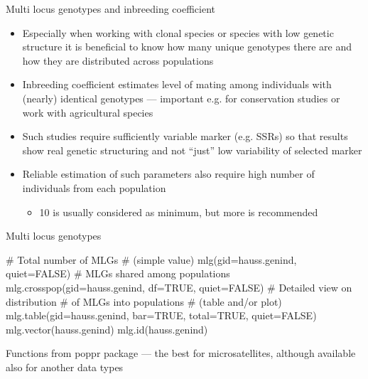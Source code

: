 \documentclass[compress, ucs, xelatex, 11pt, xcolor=svgnames, aspectratio=169,
	hyperref={
		bookmarks=true,
		unicode=true,
		colorlinks=true,
		pdftitle={Molecular data in R},
		plainpages=false,
		pdfauthor={Vojtech Zeisek},
		pdfsubject={Course about phylogeny and evolution in R},
		pdfcreator={XeLaTeX},
		pdfkeywords={R, evolution, phylogeny, molecular data},
		linkcolor=Crimson, %
		anchorcolor=Magenta, %
		citecolor=Magenta, %
		filecolor=Magenta, %
		menucolor=Magenta, %
		urlcolor=DodgerBlue, %
		pdftex},
	url={hyphens, lowtilde} %
	]{beamer}
\renewcommand{\texttt}[1]{\colorbox{Beige}{{\ttfamily #1}}}
\begin{document}
\begin{frame}{Multi locus genotypes and inbreeding coefficient}
	\begin{itemize}
		\item Especially when working with clonal species or species with low genetic structure it is beneficial to know how many unique genotypes there are and how they are distributed across populations
		\item Inbreeding coefficient estimates level of mating among individuals with (nearly) identical genotypes --- important e.g. for conservation studies or work with agricultural species
		\item Such studies require sufficiently variable marker (e.g. SSRs) so that results show real genetic structuring and not \enquote{just} low variability of selected marker
		\item Reliable estimation of such parameters also require high number of individuals from each population
		\begin{itemize}
			\item 10 is usually considered as minimum, but more is recommended
		\end{itemize}
	\end{itemize}
\end{frame}

\begin{frame}[fragile]{Multi locus genotypes}
	\begin{multicols}{2}
		\texttt{[image: mlg.png]}
		\begin{spluscode}
    # Total number of MLGs
    # (simple value)
    mlg(gid=hauss.genind, quiet=FALSE)
    # MLGs shared among populations
    mlg.crosspop(gid=hauss.genind,
      df=TRUE, quiet=FALSE)
    # Detailed view on distribution
    # of MLGs into populations
    # (table and/or plot)
    mlg.table(gid=hauss.genind,
      bar=TRUE, total=TRUE,
      quiet=FALSE)
    mlg.vector(hauss.genind)
    mlg.id(hauss.genind)
		\end{spluscode}
	\end{multicols}
	Functions from poppr package --- the best for microsatellites, although available also for another data types
\end{frame}
\end{document}
